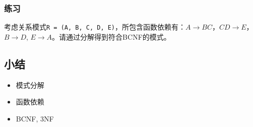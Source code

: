 \documentclass[aspectratio=169, 14pt]{beamer}
\begin{document}
\begin{frame}
	\frametitle{练习}

	考虑关系模式\texttt{R = (A, B, C, D, E)}，所包含函数依赖有：$A \rightarrow BC$，$CD \rightarrow E$，$B \rightarrow D$, $E \rightarrow A$。请通过分解得到符合BCNF的模式。

\end{frame}

\begin{frame}
	\section{\textcolor{darkmidnightblue}{小结}}
	\begin{itemize}
		\item 模式分解
		\item 函数依赖
		\item BCNF, 3NF
	\end{itemize}
\end{frame}
\end{document}
